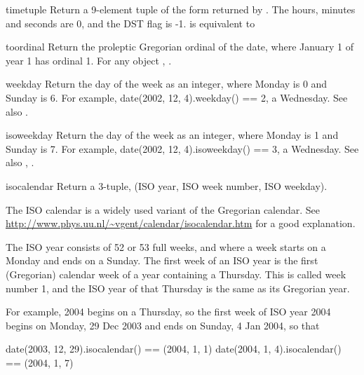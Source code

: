 \begin{methoddesc}{timetuple}{}
  Return a 9-element tuple of the form returned by
  .  The hours, minutes and seconds are
  0, and the DST flag is -1.
   is equivalent to
\end{methoddesc}

\begin{methoddesc}{toordinal}{}
  Return the proleptic Gregorian ordinal of the date, where January 1
  of year 1 has ordinal 1.  For any  object ,
  .
\end{methoddesc}

\begin{methoddesc}{weekday}{}
  Return the day of the week as an integer, where Monday is 0 and
  Sunday is 6.  For example, date(2002, 12, 4).weekday() == 2, a
  Wednesday.
  See also .
\end{methoddesc}

\begin{methoddesc}{isoweekday}{}
  Return the day of the week as an integer, where Monday is 1 and
  Sunday is 7.  For example, date(2002, 12, 4).isoweekday() == 3, a
  Wednesday.
  See also , .
\end{methoddesc}

\begin{methoddesc}{isocalendar}{}
  Return a 3-tuple, (ISO year, ISO week number, ISO weekday).

  The ISO calendar is a widely used variant of the Gregorian calendar.
  See \url{http://www.phys.uu.nl/~vgent/calendar/isocalendar.htm}
  for a good explanation.

  The ISO year consists of 52 or 53 full weeks, and where a week starts
  on a Monday and ends on a Sunday.  The first week of an ISO year is
  the first (Gregorian) calendar week of a year containing a Thursday.
  This is called week number 1, and the ISO year of that Thursday is
  the same as its Gregorian year.

  For example, 2004 begins on a Thursday, so the first week of ISO
  year 2004 begins on Monday, 29 Dec 2003 and ends on Sunday, 4 Jan
  2004, so that

  date(2003, 12, 29).isocalendar() == (2004, 1, 1)
  date(2004, 1, 4).isocalendar() == (2004, 1, 7)
\end{methoddesc}

